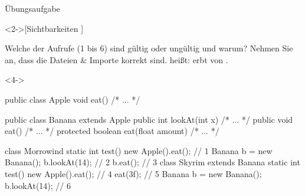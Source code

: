 \ifull
\begin{frame}[c,fragile]{Übungsaufgabe}
    \begin{exercise}<2->[Sichtbarkeiten ]
        {\small Welche der Aufrufe (1 bis 6) sind gültig oder ungültig und warum? Nehmen Sie an, dass die Dateien \& Importe korrekt sind.  heißt:  erbt von .\smallskip\par}
\begin{uncoverenv}<4->
\begin{minipage}{.7\linewidth}
\lstset{lineskip=1.5pt}%
\begin{plainjava}[morekeywords={[3]{Apple,Banana}},belowskip=4.5pt]
public class Apple { void eat() { /* ... */ } }

public class Banana extends Apple {
  public int lookAt(int x) { /* ... */ }
  public void eat() { /* ... */ }
  protected boolean eat(float amount) { /* ... */ }
}
\end{plainjava}
\begin{plainjava}[multicols=2,morekeywords={[3]{Apple,Banana,Skyrim,Morrowind}},aboveskip=4.5pt,belowskip=2pt]
class Morrowind {
  static int test() {
    new Apple().eat(); // 1
    Banana b = new Banana();
    b.lookAt(14); // 2
    b.eat(); // 3
}}
class Skyrim extends Banana {
  static int test() {
    new Apple().eat(); // 4
    eat(3f); // 5
    Banana b = new Banana();
    b.lookAt(14); // 6
}}
\end{plainjava}
\end{minipage}%
\end{uncoverenv}%
\hfill{}
    \end{exercise}
\end{frame}

